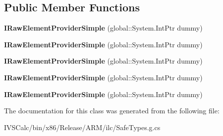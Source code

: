 \subsection*{Public Member Functions}
\begin{DoxyCompactItemize}
\item 
\mbox{\label{class_windows_1_1_u_i_1_1_xaml_1_1_automation_1_1_provider_1_1_i_raw_element_provider_simple_a3cb3ad6c957f7a6f14ee32e1fbb3d8b6}} 
{\bfseries I\+Raw\+Element\+Provider\+Simple} (global\+::\+System.\+Int\+Ptr dummy)
\item 
\mbox{\label{class_windows_1_1_u_i_1_1_xaml_1_1_automation_1_1_provider_1_1_i_raw_element_provider_simple_a3cb3ad6c957f7a6f14ee32e1fbb3d8b6}} 
{\bfseries I\+Raw\+Element\+Provider\+Simple} (global\+::\+System.\+Int\+Ptr dummy)
\item 
\mbox{\label{class_windows_1_1_u_i_1_1_xaml_1_1_automation_1_1_provider_1_1_i_raw_element_provider_simple_a3cb3ad6c957f7a6f14ee32e1fbb3d8b6}} 
{\bfseries I\+Raw\+Element\+Provider\+Simple} (global\+::\+System.\+Int\+Ptr dummy)
\item 
\mbox{\label{class_windows_1_1_u_i_1_1_xaml_1_1_automation_1_1_provider_1_1_i_raw_element_provider_simple_a3cb3ad6c957f7a6f14ee32e1fbb3d8b6}} 
{\bfseries I\+Raw\+Element\+Provider\+Simple} (global\+::\+System.\+Int\+Ptr dummy)
\item 
\mbox{\label{class_windows_1_1_u_i_1_1_xaml_1_1_automation_1_1_provider_1_1_i_raw_element_provider_simple_a3cb3ad6c957f7a6f14ee32e1fbb3d8b6}} 
{\bfseries I\+Raw\+Element\+Provider\+Simple} (global\+::\+System.\+Int\+Ptr dummy)
\end{DoxyCompactItemize}


The documentation for this class was generated from the following file\+:\begin{DoxyCompactItemize}
\item 
I\+V\+S\+Calc/bin/x86/\+Release/\+A\+R\+M/ilc/Safe\+Types.\+g.\+cs\end{DoxyCompactItemize}
